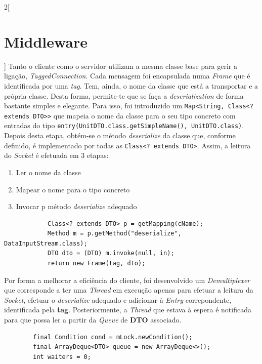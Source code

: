 \documentclass[a4paper,11pt]{article}
\begin{document}
\begin{multicols}{2}[\section{Middleware}]
    Tanto o cliente como o servidor utilizam a mesma classe base para 
    gerir a ligação, \textit{TaggedConnection}.
    Cada mensagem foi encapsulada numa \textit{Frame}
    que é identificada por uma \textit{tag}.
    Tem, ainda, o nome da classe que está a transportar e
    a própria classe.
    Desta forma, permite-te que se faça a \textit{deserialization}
    de forma bastante simples e elegante.
    Para isso, foi introduzido um \texttt{Map<String, Class<? extends DTO>>}
    que mapeia o nome da classe para o seu tipo concreto com entradas do tipo
    \texttt{entry(UnitDTO.class.getSimpleName(), UnitDTO.class)}.
    Depois desta etapa, obtém-se o método \textit{deserialize} da classe que,
    conforme definido, é implementado por todas as 
    \texttt{Class<? extends DTO>}.
    Assim, a leitura do \textit{Socket} é efetuada em 3 etapas:
    \begin{enumerate}
        \item Ler o nome da classe
        \item Mapear o nome para o tipo concreto
        \item Invocar p método \textit{deserialize} adequado
    \end{enumerate}
    \begin{verbatim}
            Class<? extends DTO> p = getMapping(cName);
            Method m = p.getMethod("deserialize", DataInputStream.class);
            DTO dto = (DTO) m.invoke(null, in);
            return new Frame(tag, dto);
    \end{verbatim}
    Por forma a melhorar a eficiência do cliente, foi desenvolvido
    um \textit{Demultiplexer} que corresponde a ter uma \textit{Thread}
    em execução apenas para efetuar a leitura da \textit{Socket}, 
    efetuar o \textit{deserialize} adequado e adicionar à \textit{Entry}
    correpondente, identificada pela \textbf{tag}.
    Posteriormente, a \textit{Thread} que estava à espera é notificada para
    que possa ler a partir da \textit{Queue} de \textbf{DTO} associado.
    \begin{verbatim}
        final Condition cond = mLock.newCondition();
        final ArrayDeque<DTO> queue = new ArrayDeque<>();
        int waiters = 0;
    \end{verbatim}
    

\end{multicols}
\end{document}
